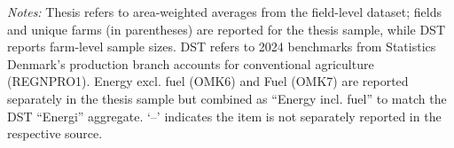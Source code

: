 \documentclass[12pt]{article}
\begin{document}
\begin{table}[htbp]
\begin{threeparttable}
\begin{tablenotes}
\footnotesize
\item \textit{Notes:} Thesis refers to area-weighted averages from the field-level dataset; fields and unique farms (in parentheses) are reported for the thesis sample, while DST reports farm-level sample sizes. DST refers to 2024 benchmarks from Statistics Denmark's production branch accounts for conventional agriculture (REGNPRO1). Energy excl. fuel (OMK6) and Fuel (OMK7) are reported separately in the thesis sample but combined as ``Energy incl. fuel'' to match the DST ``Energi'' aggregate. `--' indicates the item is not separately reported in the respective source.
\end{tablenotes}
\end{threeparttable}
\end{table}
\end{document}
